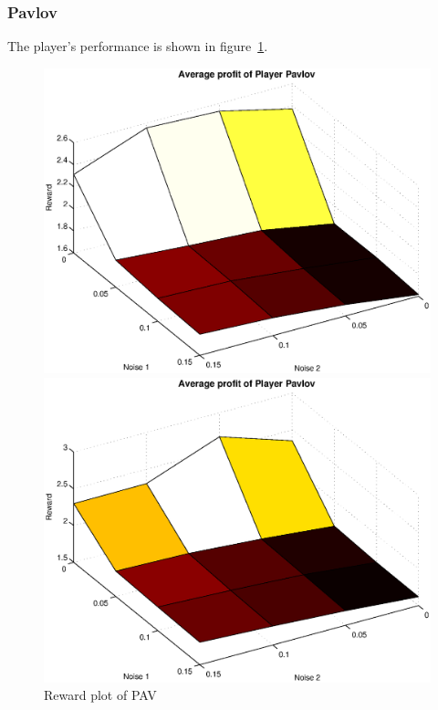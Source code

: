 \subsubsection{Pavlov}
The player's performance is shown in figure~\ref{pic player pavlov}.\\
\begin{figure}[h]
	\caption{Reward plot of PAV}
	\label{pic player pavlov}
\begin{minipage}[hbt]{0.65\textwidth}
	\centering
	\includegraphics[width=\textwidth]{pics/simulation1/Reward_vs_Noise_of_Player_Pavlov}
\end{minipage}
\hfill
\begin{minipage}[hbt]{0.3\textwidth}
	\centering
	\includegraphics[width=\textwidth]{pics/simulation2/Reward_vs_Noise_of_Player_Pavlov}
\end{minipage}

\end{figure}

